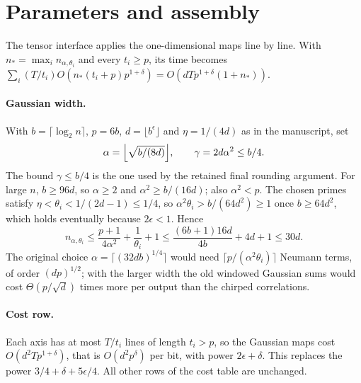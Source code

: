 \documentclass[11pt]{article}
\begin{document}


\section{Parameters and assembly}
The tensor interface applies the one-dimensional maps line by line. With
$n_*=\max_in_{\alpha,\theta_i}$ and every $t_i\ge p$, its time becomes
$\sum_i(T/t_i)O(n_*(t_i+p)p^{1+\delta})=O(dTp^{1+\delta}(1+n_*))$.

\paragraph{Gaussian width.} With $b=\lceil\log_2n\rceil$, $p=6b$,
$d=\lfloor b^\epsilon\rfloor$ and $\eta=1/(4d)$ as in the manuscript, set
\[
 \alpha=\Bigl\lfloor\sqrt{b/(8d)}\Bigr\rfloor,\qquad\gamma=2d\alpha^2\le b/4.
\]
The bound $\gamma\le b/4$ is the one used by the retained final rounding
argument. For large $n$, $b\ge96d$, so $\alpha\ge2$ and $\alpha^2\ge b/(16d)$;
also $\alpha^2<p$. The chosen primes satisfy
$\eta<\theta_i<1/(2d-1)\le1/4$, so $\alpha^2\theta_i>b/(64d^2)\ge1$ once
$b\ge64d^2$, which holds eventually because $2\epsilon<1$. Hence
\[
 n_{\alpha,\theta_i}\le\frac{p+1}{4\alpha^2}+\frac1{\theta_i}+1
 \le\frac{(6b+1)16d}{4b}+4d+1\le30d.
\]
The original choice $\alpha=\lceil(32db)^{1/4}\rceil$ would need
$\lceil p/(\alpha^2\theta_i)\rceil$ Neumann terms, of order $(dp)^{1/2}$;
with the larger width the old windowed Gaussian sums would cost
$\Theta(p/\sqrt d)$ times more per output than the chirped correlations.

\paragraph{Cost row.} Each axis has at most $T/t_i$ lines of length
$t_i>p$, so the Gaussian maps cost $O(d^2Tp^{1+\delta})$, that is
$O(d^2p^\delta)$ per bit, with power $2\epsilon+\delta$. This replaces the
power $3/4+\delta+5\epsilon/4$. All other rows of the cost table are unchanged.
\end{document}
